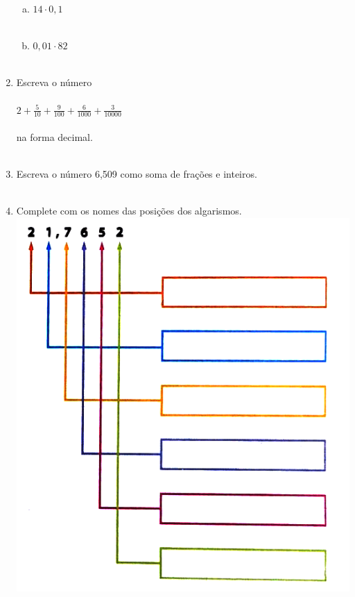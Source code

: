 \documentclass[a4paper,14pt]{article}
\begin{document}
\begin{multicols}{2}
\begin{enumerate}
\begin{enumerate}[a)]
            	\item $14 \cdot 0,1$ \\\\
            	\item $0,01 \cdot 82$ \\\\
            \end{enumerate}
        	\item Escreva o número\\\\
        	$2 + \frac{5}{10} + \frac{9}{100} + \frac{6}{1000} + \frac{3}{10000}$ \\\\
        	na forma decimal.\\\\
        	\item Escreva o número 6,509 como soma de frações e inteiros.\\\\
        	\item Complete com os nomes das posições dos algarismos.
        	\includegraphics[width=1\linewidth]{6FMA55_imagens/imagem0}
        	

\end{enumerate}
\end{multicols}
\end{document}
